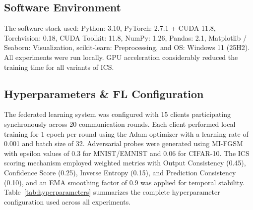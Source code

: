 \documentclass[conference]{IEEEtran}
\begin{document}
\subsection{Software Environment}
The software stack used: Python: 3.10, PyTorch: 2.7.1 + CUDA 11.8, Torchvision: 0.18, CUDA Toolkit: 11.8, NumPy: 1.26, Pandas: 2.1, Matplotlib / Seaborn: Visualization, scikit-learn: Preprocessing, and OS: Windows 11 (25H2). All experiments were run locally. GPU acceleration considerably reduced the training time for all variants of ICS.

\subsection{Hyperparameters \& FL Configuration}
The federated learning system was configured with 15 clients participating synchronously across 20 communication rounds. Each client performed local training for 1 epoch per round using the Adam optimizer with a learning rate of 0.001 and batch size of 32. Adversarial probes were generated using MI-FGSM with epsilon values of 0.3 for MNIST/EMNIST and 0.06 for CIFAR-10. The ICS scoring mechanism employed weighted metrics with Output Consistency (0.45), Confidence Score (0.25), Inverse Entropy (0.15), and Prediction Consistency (0.10), and an EMA smoothing factor of 0.9 was applied for temporal stability. Table~\ref{tab:hyperparameters} summarizes the complete hyperparameter configuration used across all experiments.
\end{document}
